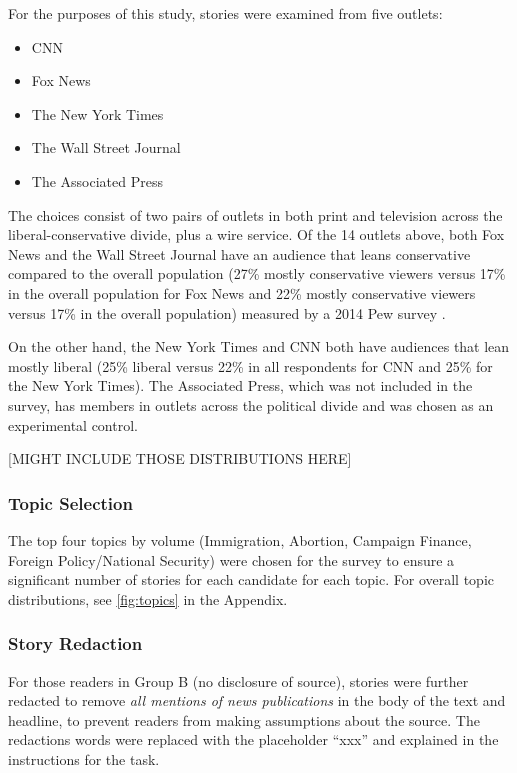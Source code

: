     For the purposes of this study, stories were examined from five outlets: 

    \begin{itemize}
    \itemsep-1em 
      \item CNN
      \item Fox News  
      \item The New York Times
      \item The Wall Street Journal 
      \item The Associated Press 
    \end{itemize}

    The choices consist of two pairs of outlets in both print and television across the liberal-conservative divide, plus a wire service. Of the 14 outlets above, both Fox News and the Wall Street Journal have an audience that leans conservative compared to the overall population (27\% mostly conservative viewers versus 17\% in the overall population for Fox News and 22\% mostly conservative viewers versus 17\% in the overall population) measured by a 2014 Pew survey \cite{PoliticalPolarization}.

    On the other hand, the New York Times and CNN both have audiences that lean mostly liberal (25\% liberal versus 22\% in all respondents for CNN and 25\% for the New York Times). The Associated Press, which was not included in the survey, has members in outlets across the political divide and was chosen as an experimental control. 

    [MIGHT INCLUDE THOSE DISTRIBUTIONS HERE]

    \subsubsection{Topic Selection}

    The top four topics by volume (Immigration, Abortion, Campaign Finance, Foreign Policy/National Security) were chosen for the survey to ensure a significant number of stories for each candidate for each topic. For overall topic distributions, see \ref{fig:topics} in the Appendix.
     

    \subsubsection{Story Redaction}
    For those readers in Group B (no disclosure of source), stories were further redacted to remove \emph{all mentions of news publications} in the body of the text and headline, to prevent readers from making assumptions about the source. The redactions words were replaced with the placeholder ``xxx'' and explained in the instructions for the task.


